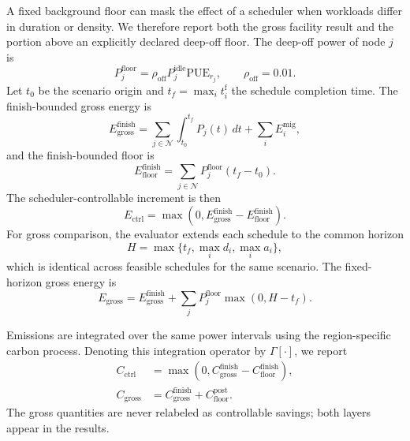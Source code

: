 A fixed background floor can mask the effect of a scheduler when workloads differ in duration or density. We therefore report both the gross facility result and the portion above an explicitly declared deep-off floor. The deep-off power of node $j$ is
\begin{equation}
P^{\mathrm{floor}}_j=\rho_{\mathrm{off}}P_j^{\mathrm{idle}}\mathrm{PUE}_{r_j}, \qquad \rho_{\mathrm{off}}=0.01.
\label{eq:floor-power}
\end{equation}
Let $t_0$ be the scenario origin and $t_f=\max_i t_i^{\mathrm{f}}$ the schedule completion time. The finish-bounded gross energy is
\begin{equation}
E^{\mathrm{finish}}_{\mathrm{gross}}
=\sum_{j\in\mathcal{N}}\int_{t_0}^{t_f}P_j(t)\,dt
+\sum_i E_i^{\mathrm{mig}},
\label{eq:finish-energy}
\end{equation}
and the finish-bounded floor is
\begin{equation}
E^{\mathrm{finish}}_{\mathrm{floor}}
=\sum_{j\in\mathcal{N}}P^{\mathrm{floor}}_j(t_f-t_0).
\end{equation}
The scheduler-controllable increment is then
\begin{equation}
E_{\mathrm{ctrl}}=\max\left(0,E^{\mathrm{finish}}_{\mathrm{gross}}-E^{\mathrm{finish}}_{\mathrm{floor}}\right).
\label{eq:controllable-energy}
\end{equation}
For gross comparison, the evaluator extends each schedule to the common horizon
\begin{equation}
H=\max\{t_f,\max_i d_i,\max_i a_i\},
\label{eq:fixed-horizon}
\end{equation}
which is identical across feasible schedules for the same scenario. The fixed-horizon gross energy is
\begin{equation}
E_{\mathrm{gross}}=E^{\mathrm{finish}}_{\mathrm{gross}}+
\sum_j P^{\mathrm{floor}}_j\max(0,H-t_f).
\label{eq:gross-energy}
\end{equation}

Emissions are integrated over the same power intervals using the region-specific carbon process. Denoting this integration operator by $\Gamma[\cdot]$, we report
\begin{align}
C_{\mathrm{ctrl}} &= \max\left(0,C^{\mathrm{finish}}_{\mathrm{gross}}-C^{\mathrm{finish}}_{\mathrm{floor}}\right), \\
C_{\mathrm{gross}} &= C^{\mathrm{finish}}_{\mathrm{gross}}+C^{\mathrm{post}}_{\mathrm{floor}}.
\label{eq:carbon-layers}
\end{align}
The gross quantities are never relabeled as controllable savings; both layers appear in the results.

